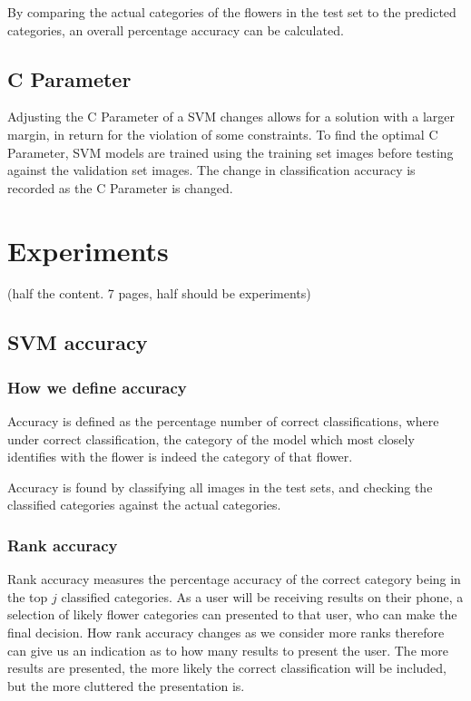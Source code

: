 \documentclass[11pt, a4paper]{report}
\begin{document}
By comparing the actual categories of the flowers in the test set to the predicted categories, an overall percentage accuracy can be calculated.

\subsection{C Parameter}

Adjusting the C Parameter of a SVM changes allows for a solution with a larger margin, in return for the violation of some constraints. To find the optimal C Parameter, SVM models are trained using the training set images  before testing against the validation set images. The change in classification accuracy is recorded as the C Parameter is changed. 


\section{Experiments}
(half the content. 7 pages, half should be experiments)

\subsection{SVM accuracy}

\subsubsection{How we define accuracy}

Accuracy is defined as the percentage number of correct classifications, where under correct classification, the category of the model which most closely identifies with the flower is indeed the category of that flower.

Accuracy is found by classifying all images in the test sets, and checking the classified categories against the actual categories. 

\subsubsection{Rank accuracy}

Rank accuracy measures the percentage accuracy of the correct category being in the top $j$ classified categories. As a user will be receiving results on their phone, a selection of likely flower categories can presented to that user, who can make the final decision. How rank accuracy changes as we consider more ranks therefore can give us an indication as to how many results to present the user. The more results are presented, the more likely the correct classification will be included, but the more cluttered the presentation is.
\end{document}
